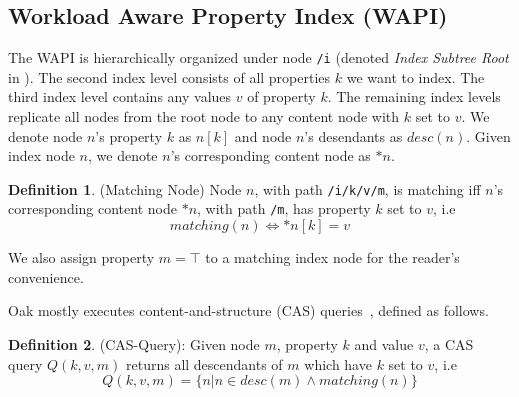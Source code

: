 \documentclass[abstracton,12pt]{scrartcl}
\theoremstyle{definition}
\newtheorem{definition}{Definition}
\begin{document}
\subsection{Workload Aware Property Index (WAPI)}
\label{sec:wapi}

The WAPI is hierarchically organized under node \texttt{/i} (denoted
\textit{Index Subtree Root} in ).
The second index level consists of all properties $k$ we want
to index. The third index level contains any values $v$ of property $k$.
The remaining index levels replicate all nodes from the root node to any
content node with $k$ set to $v$. We denote node $n$'s property $k$ as
$n[k]$ and node $n$'s desendants as $desc(n)$. Given index node $n$, we denote
$n$'s corresponding content node as $*n$.

\begin{definition}
  (Matching Node) Node $n$, with path \texttt{/i/k/v/m}, is matching
  iff $n$'s corresponding content node $*n$, with path \texttt{/m}, has property
  $k$ set to $v$, i.e
  $$ matching(n) \iff *n[k] = v $$
  \label{def:matching_node}
\end{definition}

We also assign property $m = \top$ to a matching index node for the reader's convenience.


Oak mostly executes content-and-structure (CAS) queries~\cite{CM15}, defined as
follows.

\begin{definition}
  (CAS-Query): Given node $m$, property $k$ and value $v$, a CAS query
  $Q(k,v,m)$ returns all descendants of $m$ which have $k$ set to $v$, i.e
  $$ Q(k,v,m) = \{ n | n \in desc(m) \land matching(n)\} $$
\end{definition}
\end{document}
